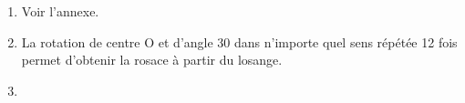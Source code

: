 \documentclass[10pt]{article}
\begin{document}
\begin{enumerate}
\item %
Voir l'annexe. 
\item %


%

La rotation de centre O et d'angle 30\degres{} dans n'importe quel sens  répétée 12 fois permet d'obtenir la rosace à partir du losange. 
\item %



\end{enumerate}
\end{document}

